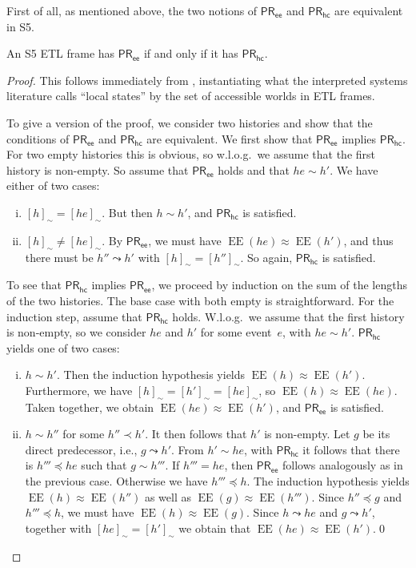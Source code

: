 \documentclass{article}
\newcommand{\PRhc}{\ensuremath{\mathsf{PR_{hc}}}\xspace}
\newcommand{\PRee}{\ensuremath{\mathsf{PR_{ee}}}\xspace}
\newcommand{\acc}{\sim}
\newcommand{\tiff}{if and only if\xspace}
\DeclareMathOperator{\EE}{EE}
\newcounter{#1}
\newcommand{\qedhere}{\qed}
\begin{document}
First of all,
as mentioned above,
the two notions of \PRee and \PRhc are equivalent in S5.
\begin{proposition}
  \label{result:pr-ee-equiv-pr-hc}
  An S5 ETL frame has \PRee \tiff it has \PRhc.
\end{proposition}
\begin{proof}
  This follows immediately from \cite[Proposition~2.1]{van_der_meyden_axioms_1993},
  instantiating what the interpreted systems literature calls ``local states''
  by the set of accessible worlds in ETL frames.

  To give a version of the proof,
  we consider two histories and show that the conditions of \PRee and \PRhc are equivalent.
  We first show that \PRee implies \PRhc.
  For two empty histories this is obvious,
  so w.l.o.g.~we assume that the first history is non-empty.
  So assume that \PRee holds and that $he\acc h'$.
  We have either of two cases:
  \begin{enumerate}[(i)]
  \item $[h]_\acc=[he]_\acc$. But then $h\acc h'$, and \PRhc is satisfied.
  \item $[h]_\acc\neq [he]_\acc$.
    By \PRee, we must have $\EE(he)\approx\EE(h')$,
    and thus there must be $h''\leadsto h'$ with $[h]_\acc=[h'']_\acc$.
    So again, \PRhc is satisfied.
  \end{enumerate}
  To see that \PRhc implies \PRee, we proceed by induction on the sum of the lengths of the two histories.
  The base case with both empty is straightforward.
  For the induction step, assume that \PRhc holds.
  W.l.o.g.~we assume that the first history is non-empty,
  so we consider $he$ and $h'$ for some event~$e$, with $he\acc h'$.
  \PRhc yields one of two cases:
  \begin{enumerate}[(i)]
  \item $h\acc h'$. Then the induction hypothesis yields $\EE(h)\approx\EE(h')$.
    Furthermore, we have $[h]_\acc=[h']_\acc=[he]_\acc$, so $\EE(h)\approx\EE(he)$.
    Taken together, we obtain $\EE(he)\approx\EE(h')$, and \PRee is satisfied.
  \item $h\acc h''$ for some $h''\prec h'$.
    It then follows that $h'$ is non-empty.
    Let $g$ be its direct predecessor, i.e., $g\leadsto h'$.
    From $h'\acc he$, with \PRhc it follows that there is $h'''\preceq he$ such that $g\acc h'''$.
    If $h'''=he$, then \PRee follows analogously as in the previous case.
    Otherwise we have $h'''\preceq h$.
    The induction hypothesis yields $\EE(h)\approx\EE(h'')$
    as well as $\EE(g)\approx\EE(h''')$.
    Since $h''\preceq g$ and $h'''\preceq h$,
    we must have $\EE(h)\approx\EE(g)$.
    Since $h\leadsto he$ and $g\leadsto h'$, together with $[he]_\acc=[h']_\acc$
    we obtain that $\EE(he)\approx\EE(h')$.\qedhere
  \end{enumerate}
\end{proof}
\end{document}
